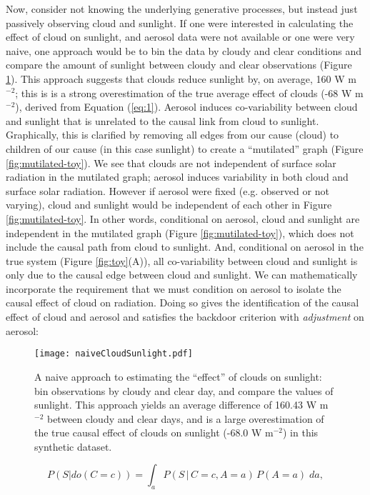 \documentclass[12pt]{article}
\begin{document}
Now, consider not knowing the underlying generative processes, but
instead just passively observing cloud and sunlight. If one were
interested in calculating the effect of cloud on sunlight, and aerosol
data were not available or one were very naive, one approach would be
to bin the data by cloudy and clear conditions and compare the amount
of sunlight between cloudy and clear observations (Figure
\ref{fig:naive-cloud-sunlight}). This approach suggests that clouds
reduce sunlight by, on average, 160 W m$^{-2}$; this is is a strong
overestimation of the true average effect of clouds (-68 W m$^{-2}$),
derived from Equation (\ref{eq:1}). Aerosol induces co-variability
between cloud and sunlight that is unrelated to the causal link from
cloud to sunlight. Graphically, this is clarified by removing all
edges from our cause (cloud) to children of our cause (in this case
sunlight) to create a ``mutilated'' graph (Figure
\ref{fig:mutilated-toy}). We see that clouds are not independent of
surface solar radiation in the mutilated graph; aerosol induces
variability in both cloud and surface solar radiation.  However if
aerosol were fixed (e.g. observed or not varying), cloud and sunlight
would be independent of each other in Figure
\ref{fig:mutilated-toy}. In other words, conditional on aerosol, cloud
and sunlight are independent in the mutilated graph (Figure
\ref{fig:mutilated-toy}), which does not include the causal path from
cloud to sunlight. And, conditional on aerosol in the true system
(Figure \ref{fig:toy}(A)), all co-variability between cloud and
sunlight is only due to the causal edge between cloud and sunlight.
We can mathematically incorporate the requirement that we must
condition on aerosol to isolate the causal effect of cloud on
radiation. Doing so gives the identification of the causal effect of
cloud and aerosol and satisfies the backdoor criterion with
\textit{adjustment} on aerosol:

\begin{figure}
  \texttt{[image: naiveCloudSunlight.pdf]}
  \caption{A naive approach to estimating the ``effect'' of clouds on
    sunlight: bin observations by cloudy and clear day, and compare
    the values of sunlight. This approach yields an average difference
    of 160.43 W m$^{-2}$ between cloudy and clear days, and is a large
    overestimation of the true causal effect of clouds on sunlight
    (-68.0 W m$^{-2}$) in this synthetic dataset.}
  \label{fig:naive-cloud-sunlight}
\end{figure}

\begin{equation}
  P(S | do(C = c)) = \int_{a} P(S \, | \, C = c,
  A=a) \, P(A=a) \; da,
  \label{eq:3}
\end{equation}
\end{document}

